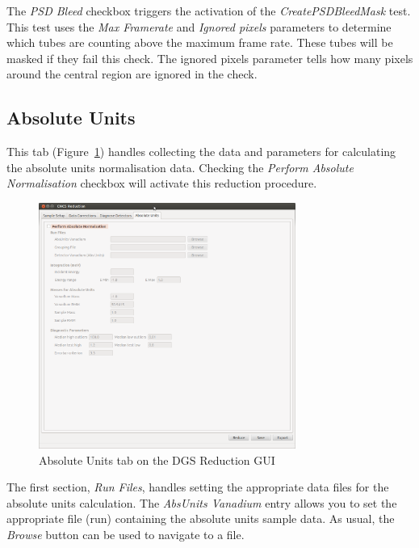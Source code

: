 The \textit{PSD Bleed} checkbox triggers the activation of the \textit{CreatePSDBleedMask} test.
This test uses the \textit{Max Framerate} and \textit{Ignored pixels} parameters to determine which tubes are counting above the maximum frame rate. These tubes will be masked if they fail this check. The ignored pixels parameter tells how many pixels around the central region are ignored in the check.
\subsection{Absolute Units}
This tab (Figure~\ref{fig:AbsUnits}) handles collecting the data and parameters for calculating the absolute units normalisation data. Checking the \textit{Perform Absolute Normalisation} checkbox will activate this reduction procedure. 

\begin{figure}[ht]
\centerline{\includegraphics[width=0.75\textwidth]{figures/AbsoluteUnits.png}}
\caption{Absolute Units tab on the DGS Reduction GUI}
\label{fig:AbsUnits}
\end{figure}

The first section, \textit{Run Files}, handles setting the appropriate data files for the absolute units calculation. The \textit{AbsUnits Vanadium} entry allows you to set the appropriate file (run) containing the absolute units sample data. As usual, the \textit{Browse} button can be used to navigate to a file.